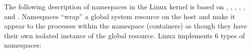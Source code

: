 \newpage
The following description of namespaces in the Linux kernel is based on \cite{namespaces1}, \cite{namespaces2}, \cite{namespaces3}, \cite{namespaces4}, \cite{namespaces5}, and \cite{namespaces6}.
Namespaces ``wrap'' a global system resource on the host and make it appear to the processes within the namespace (containers) as though they have their own isolated instance of the global resource. Linux implements 6 types of namespaces: 
